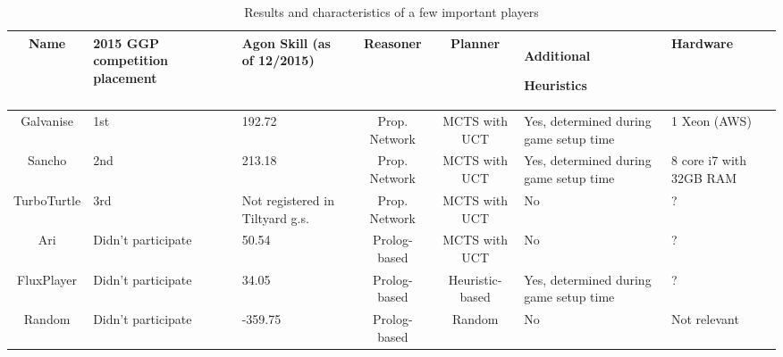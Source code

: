 \begin{table}[h]
\caption{Results and characteristics of a few important players}
\label{table:Players}
\small
\begin{tabular}{| c | P{2cm} | P{2cm} | c | c | P{2.5cm} | P{2.5cm} |}
\hline  Name & 2015 GGP competition placement & Agon Skill (as of 12/2015) & Reasoner & Planner & Additional \par Heuristics & Hardware \\

\hline  Galvanise & 1st & 192.72 & Prop. Network & MCTS with UCT & Yes, determined during game setup time & 1 Xeon (AWS) \\

\hline  Sancho & 2nd & 213.18 & Prop. Network & MCTS with UCT & Yes, determined during game setup time & 8 core i7 with 32GB RAM \\

\hline  TurboTurtle & 3rd & Not registered in Tiltyard g.s. & Prop. Network & MCTS with UCT & No & ? \\


\hline  Ari & Didn't participate & 50.54 & Prolog-based & MCTS with UCT & No & ? \\

\hline  FluxPlayer & Didn't participate & 34.05 & Prolog-based & Heuristic-based & Yes, determined during game setup time & ? \\

\hline  Random & Didn't participate & -359.75 & Prolog-based & Random & No & Not relevant \\



\hline
\end{tabular}
\end{table}



